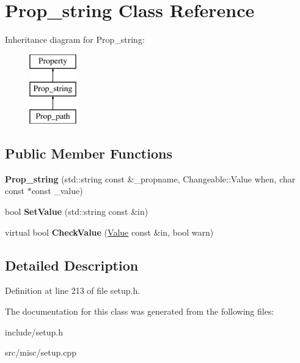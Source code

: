 \hypertarget{classProp__string}{\section{Prop\-\_\-string Class Reference}
\label{classProp__string}
}
Inheritance diagram for Prop\-\_\-string\-:\begin{figure}[H]
\begin{center}
\leavevmode
\includegraphics[height=3.000000cm]{classProp__string}
\end{center}
\end{figure}
\subsection*{Public Member Functions}
\begin{DoxyCompactItemize}
\item 
\hypertarget{classProp__string_ad7cfeff160dad431615b378934fd409f}{{\bfseries Prop\-\_\-string} (std\-::string const \&\-\_\-propname, Changeable\-::\-Value when, char const $\ast$const \-\_\-value)}\label{classProp__string_ad7cfeff160dad431615b378934fd409f}

\item 
\hypertarget{classProp__string_aa0bdbb5d31c417f314d8a4b2b3453ded}{bool {\bfseries Set\-Value} (std\-::string const \&in)}\label{classProp__string_aa0bdbb5d31c417f314d8a4b2b3453ded}

\item 
\hypertarget{classProp__string_ad1fceed071e39d195d2369e1c836ff9a}{virtual bool {\bfseries Check\-Value} (\hyperlink{classValue}{Value} const \&in, bool warn)}\label{classProp__string_ad1fceed071e39d195d2369e1c836ff9a}

\end{DoxyCompactItemize}


\subsection{Detailed Description}


Definition at line 213 of file setup.\-h.



The documentation for this class was generated from the following files\-:\begin{DoxyCompactItemize}
\item 
include/setup.\-h\item 
src/misc/setup.\-cpp\end{DoxyCompactItemize}
